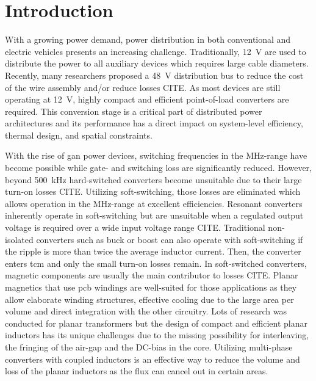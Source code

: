 \documentclass{IPEC2026}
\newcommand{\ac}{\gls}
\begin{document}
\section{Introduction}
With a growing power demand, power distribution in both conventional and electric vehicles presents an increasing challenge. Traditionally, \qty{12}{\V} are used to distribute the power to all auxiliary devices which requires large cable diameters. Recently, many researchers proposed a \qty{48}{\V} distribution bus to reduce the cost of the wire assembly and/or reduce losses CITE. As most devices are still operating at \qty{12}{\V}, highly compact and efficient point-of-load converters are required. This conversion stage is a critical part of distributed power architectures and its performance has a direct impact on system-level efficiency, thermal design, and spatial constraints. \par
With the rise of \ac{gan} power devices, switching frequencies in the MHz-range have become possible while gate- and switching loss are significantly reduced. However, beyond \qty{500}{\kHz} hard-switched converters become unsuitable due to their large turn-on losses CITE. Utilizing soft-switching, those losses are eliminated which allows operation in the MHz-range at excellent efficiencies. Resonant converters inherently operate in soft-switching but are unsuitable when a regulated output voltage is required over a wide input voltage range CITE. Traditional non-isolated converters such as buck or boost can also operate with soft-switching if the ripple is more than twice the average inductor current. Then, the converter enters \ac{tcm} and only the small turn-on losses remain.
In soft-switched converters, magnetic components are usually the main contributor to losses CITE. Planar magnetics that use \ac{pcb} windings are well-suited for those applications as they allow elaborate winding structures, effective cooling due to the large area per volume and direct integration with the other circuitry. Lots of research was conducted for planar transformers but the design of compact and efficient planar inductors has its unique challenges due to the missing possibility for interleaving, the fringing of the air-gap and the DC-bias in the core.
Utilizing multi-phase converters with coupled inductors is an effective way to reduce the volume and loss of the planar inductors as the flux can cancel out in certain areas. \par
\end{document}
